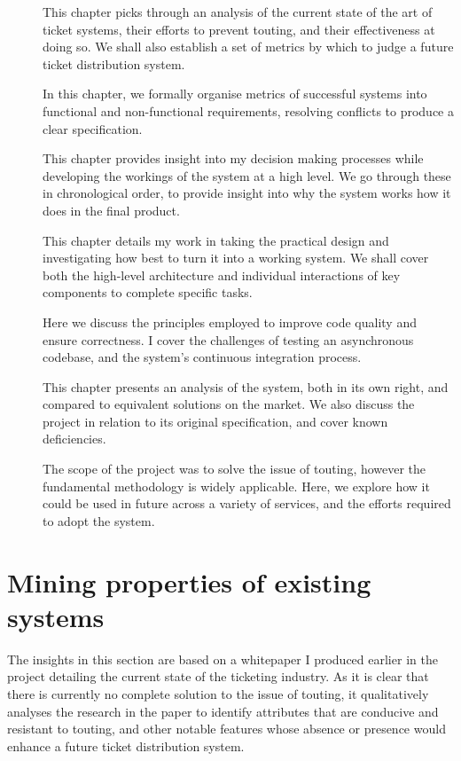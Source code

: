 \documentclass[12pt,a4paper]{bhamdissertation}
\begin{document}
\begin{description}
    \item[] This chapter picks through an analysis of the current state of the art of ticket systems, their efforts to prevent touting, and their effectiveness at doing so. We shall also establish a set of metrics by which to judge a future ticket distribution system.
    \item[] In this chapter, we formally organise metrics of successful systems into functional and non-functional requirements, resolving conflicts to produce a clear specification.
    \item[] This chapter provides insight into my decision making processes while developing the workings of the system at a high level. We go through these in chronological order, to provide insight into why the system works how it does in the final product.
    \item[] This chapter details my work in taking the practical design and investigating how best to turn it into a working system. We shall cover both the high-level architecture and individual interactions of key components to complete specific tasks.
    \item[] Here we discuss the principles employed to improve code quality and ensure correctness. I cover the challenges of testing an asynchronous codebase, and the system's continuous integration process.
    \item[] This chapter presents an analysis of the system, both in its own right, and compared to equivalent solutions on the market. We also discuss the project in relation to its original specification, and cover known deficiencies.
    \item[] The scope of the project was to solve the issue of touting, however the fundamental methodology is widely applicable. Here, we explore how it could be used in future across a variety of services, and the efforts required to adopt the system.
\end{description}


\chapter{Mining properties of existing systems} \label{mining}

The insights in this section are based on a whitepaper \cite{B17} I produced earlier in the project detailing the current state of the ticketing industry. As it is clear that there is currently no complete solution to the issue of touting, it qualitatively analyses the research in the paper to identify attributes that are conducive and resistant to touting, and other notable features whose absence or presence would enhance a future ticket distribution system.
\end{document}
